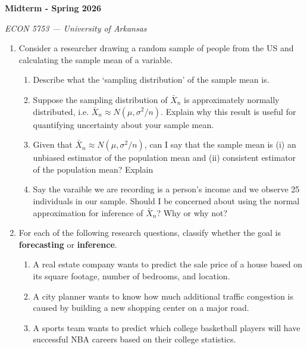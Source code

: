 \documentclass[12pt]{article}
\begin{document}
\begin{center}
  {\Huge\bf Midterm - Spring 2026}

  \smallskip
  {\large\it ECON 5753 — University of Arkansas}
\end{center}

\medskip
\begin{enumerate}
  \item Consider a researcher drawing a random sample of people from the US and calculating the sample mean of a variable.

    \begin{enumerate}
      \item Describe what the `sampling distribution' of the sample mean is.

      \item Suppose the sampling distribution of $\bar{X}_n$ is approximately normally distributed, i.e. $\bar{X}_n \approx N(\mu, \sigma^2/n)$.
        Explain why this result is useful for quantifying uncertainty about your sample mean.

      \item Given that $\bar{X}_n \approx N(\mu, \sigma^2/n)$, can I say that the sample mean is (i) an unbiased estimator of the population mean and (ii) consistent estimator of the population mean?
        Explain

      \item Say the varaible we are recording is a person's income and we observe 25 individuals in our sample.
        Should I be concerned about using the normal approximation for inference of $\bar{X}_n$?
        Why or why not?
    \end{enumerate}

    \bigskip
  \item For each of the following research questions, classify whether the goal is \textbf{forecasting} or \textbf{inference}.

    \begin{enumerate}
      \item A real estate company wants to predict the sale price of a house based on its square footage, number of bedrooms, and location.

      \item A city planner wants to know how much additional traffic congestion is caused by building a new shopping center on a major road.

      \item A sports team wants to predict which college basketball players will have successful NBA careers based on their college statistics.


\end{enumerate}
\end{enumerate}
\end{document}
